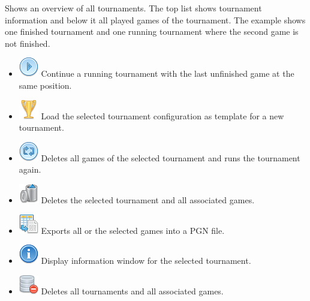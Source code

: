 \documentclass[11pt,a4paper]{article}
\begin{document}
Shows an overview of all tournaments. The top list shows tournament information and below it all played games of the tournament. The example shows one finished tournament and one running tournament where the second game is not finished.

\begin{itemize}
	\item \includegraphics[scale=0.5]{control_play_blue.png} Continue a running tournament with the last unfinished game at the same position.
	\item \includegraphics[scale=0.5]{cup_gold.png} Load the selected tournament configuration as template for a new tournament.
	\item \includegraphics[scale=0.5]{control_repeat_blue.png} Deletes all games of the selected tournament and runs the tournament again.
	\item \includegraphics[scale=0.5]{bin.png} Deletes the selected tournament and all associated games.
	\item \includegraphics[scale=0.5]{text_exports.png} Exports all or the selected games into a PGN file. 	
	\item \includegraphics[scale=0.5]{information.png} Display information window for the selected tournament.    		
	\item \includegraphics[scale=0.5]{database_delete.png} Deletes all tournaments and all associated games.
\end{itemize}
\end{document}
